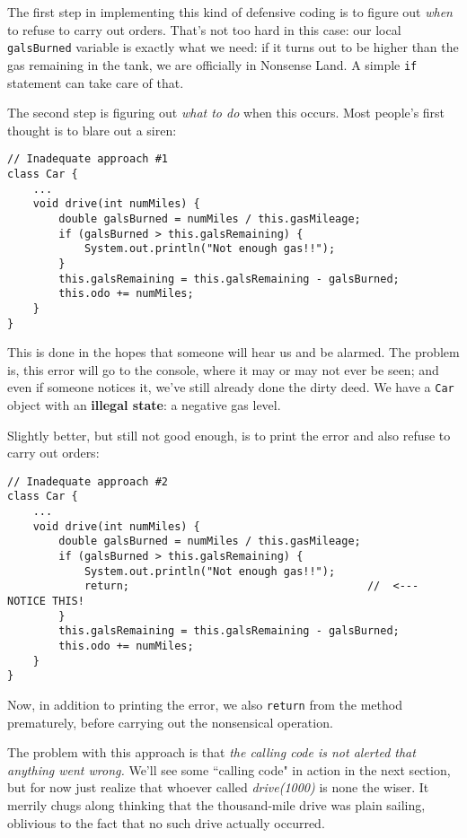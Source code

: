 The first step in implementing this kind of defensive coding is to figure out
\textit{when} to refuse to carry out orders. That's not too hard in this case:
our local \texttt{galsBurned} variable is exactly what we need: if it turns
out to be higher than the gas remaining in the tank, we are officially in
Nonsense Land. A simple \texttt{if} statement can take care of that.

The second step is figuring out \textit{what to do} when this occurs. Most
people's first thought is to blare out a siren:

\begin{Verbatim}[samepage=true,fontsize=\scriptsize,frame=single]
// Inadequate approach #1
class Car {
    ...
    void drive(int numMiles) {
        double galsBurned = numMiles / this.gasMileage;
        if (galsBurned > this.galsRemaining) {
            System.out.println("Not enough gas!!");
        }
        this.galsRemaining = this.galsRemaining - galsBurned;
        this.odo += numMiles;
    }
}
\end{Verbatim}

This is done in the hopes that someone will hear us and be alarmed. The
problem is, this error will go to the console, where it may or may not ever be
seen; and even if someone notices it, we've still already done the dirty deed.
We have a \texttt{Car} object with an \textbf{illegal state}: a negative gas
level.

Slightly better, but still not good enough, is to print the error and also
refuse to carry out orders:

\begin{Verbatim}[samepage=true,fontsize=\scriptsize,frame=single]
// Inadequate approach #2
class Car {
    ...
    void drive(int numMiles) {
        double galsBurned = numMiles / this.gasMileage;
        if (galsBurned > this.galsRemaining) {
            System.out.println("Not enough gas!!");
            return;                                     //  <---  NOTICE THIS!
        }
        this.galsRemaining = this.galsRemaining - galsBurned;
        this.odo += numMiles;
    }
}
\end{Verbatim}

Now, in addition to printing the error, we also \texttt{return} from the
method prematurely, before carrying out the nonsensical operation.

The problem with this approach is that \textit{the calling code is not alerted
that anything went wrong.} We'll see some ``calling code" in action in the
next section, but for now just realize that whoever called
\textit{drive(1000)} is none the wiser. It merrily chugs along thinking that
the thousand-mile drive was plain sailing, oblivious to the fact that no such
drive actually occurred.

